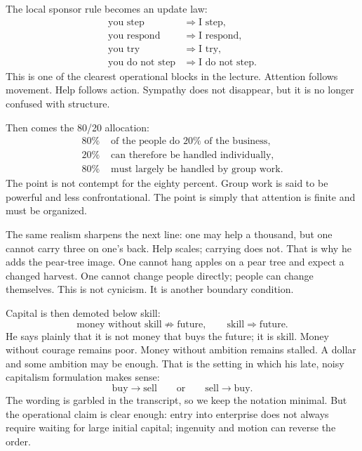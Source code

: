 The local sponsor rule becomes an update law:
\begin{align}
\text{you step} &\Rightarrow \text{I step},\\
\text{you respond} &\Rightarrow \text{I respond},\\
\text{you try} &\Rightarrow \text{I try},\\
\text{you do not step} &\Rightarrow \text{I do not step}.
\end{align}
This is one of the clearest operational blocks in the lecture. Attention follows movement. Help follows action. Sympathy does not disappear, but it is no longer confused with structure.

Then comes the 80/20 allocation:
\begin{align}
80\% &\text{ of the people do }20\%\text{ of the business},\\
20\% &\text{ can therefore be handled individually},\\
80\% &\text{ must largely be handled by group work}.
\end{align}
The point is not contempt for the eighty percent. Group work is said to be powerful and less confrontational. The point is simply that attention is finite and must be organized.

The same realism sharpens the next line: one may help a thousand, but one cannot carry three on one's back. Help scales; carrying does not. That is why he adds the pear-tree image. One cannot hang apples on a pear tree and expect a changed harvest. One cannot change people directly; people can change themselves. This is not cynicism. It is another boundary condition.

Capital is then demoted below skill:
\begin{equation}
\text{money without skill} \not\Rightarrow \text{future},
\qquad
\text{skill} \Rightarrow \text{future}.
\end{equation}
He says plainly that it is not money that buys the future; it is skill. Money without courage remains poor. Money without ambition remains stalled. A dollar and some ambition may be enough. That is the setting in which his late, noisy capitalism formulation makes sense:
\begin{equation}
\text{buy}\to\text{sell}
\qquad\text{or}\qquad
\text{sell}\to\text{buy}.
\end{equation}
The wording is garbled in the transcript, so we keep the notation minimal. But the operational claim is clear enough: entry into enterprise does not always require waiting for large initial capital; ingenuity and motion can reverse the order.

